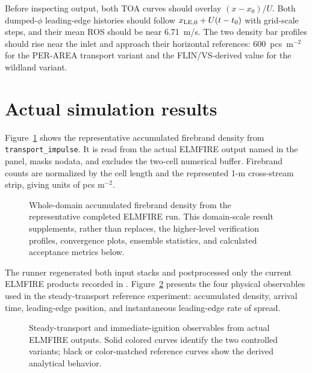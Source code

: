 Before inspecting output, both TOA curves should overlay $(x-x_0)/U$. Both
dumped-$\phi$ leading-edge histories should follow
$x_{\rm LE,0}+U(t-t_0)$ with grid-scale steps, and their
mean ROS should be near 6.71~m/s. The two density bar profiles should rise near
the inlet and approach their horizontal references: 600~pcs~m$^{-2}$ for the
PER-AREA transport variant and the FLIN/VS-derived value for the wildland variant.
\section{Actual simulation results}

Figure~\ref{fig:domain-result} shows the representative accumulated firebrand density from \texttt{transport\_impulse}.
It is read from the actual ELMFIRE output named in the panel, masks nodata, and excludes
the two-cell numerical buffer.  Firebrand counts are normalized by the cell length and the represented 1-m cross-stream strip, giving units of pcs m$^{-2}$.

\begin{figure}[H]
\centering
{}
\caption{Whole-domain accumulated firebrand density from the representative completed ELMFIRE run.  This
domain-scale result supplements, rather than replaces, the higher-level verification
profiles, convergence plots, ensemble statistics, and calculated acceptance metrics below.}
\label{fig:domain-result}
\end{figure}


The runner regenerated both input stacks and postprocessed only the current
ELMFIRE products recorded in .
Figure~\ref{fig:steady-reference} presents the four physical observables
used in the steady-transport reference experiment: accumulated density, arrival
time, leading-edge position, and instantaneous leading-edge rate of spread.

\begin{figure}[H]
\centering
{}
\caption{Steady-transport and immediate-ignition observables from actual
ELMFIRE outputs. Solid colored curves identify the two controlled variants;
black or color-matched reference curves show the derived analytical behavior.}
\label{fig:steady-reference}
\end{figure}

\FloatBarrier

